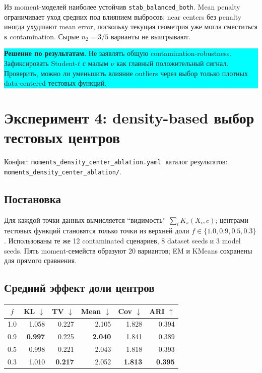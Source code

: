 \documentclass[11pt,a4paper]{article}
\newcommand{\code}[1]{{\footnotesize\nolinkurl{#1}}}
\newcommand{\best}[1]{\textbf{\color{green}#1}}
\newcommand{\decision}[1]{%
  \begin{center}
  \colorbox{cyan}{\parbox{0.94\linewidth}{%
    \textbf{\sffamily\color{navy}Решение по результатам.} #1}}
  \end{center}
}
\newcommand{\configlink}[1]{%
  \code{#1.yaml}}
\newcommand{\resultslink}[1]{%
  \code{#1/}}
\newcommand{\runrefs}[1]{%
  \small\color{midgray}%
  Конфиг: \configlink{#1}\enspace|\enspace
  каталог результатов: \resultslink{#1}.%
  \normalsize\color{black}}
\begin{document}
Из moment-моделей наиболее устойчив \code{stab_balanced_both}.
Mean penalty ограничивает уход средних под влиянием выбросов; near centers
без penalty иногда ухудшают mean error, поскольку текущая геометрия уже могла
сместиться к contamination. Сырые $n_2=3/5$ варианты не выигрывают.

\decision{Не заявлять общую contamination-robustness. Зафиксировать
Student-$t$ с малым $\nu$ как главный положительный сигнал. Проверить,
можно ли уменьшить влияние outliers через выбор только плотных data-centered
тестовых функций.}

\section{Эксперимент 4: density-based выбор тестовых центров}

\runrefs{moments_density_center_ablation}

\subsection{Постановка}

Для каждой точки данных вычисляется ``видимость''
$\sum_i K_s(X_i,c)$; центрами тестовых функций становятся только точки из
верхней доли $f\in\{1.0,0.9,0.5,0.3\}$. Использованы те же 12 contaminated
сценариев, 8 dataset seeds и 3 model seeds. Пять moment-семейств образуют
20 вариантов; EM и KMeans сохранены для прямого сравнения.

\subsection{Средний эффект доли центров}

\begin{center}
\small
\begin{tabular}{@{}crrrrr@{}}
\toprule
\rowcolor{lightgray}
$f$ & \textbf{KL} $\downarrow$ & \textbf{TV} $\downarrow$ &
\textbf{Mean} $\downarrow$ & \textbf{Cov} $\downarrow$ & \textbf{ARI} $\uparrow$\\
\midrule
1.0 & 1.058 & 0.227 & 2.105 & 1.828 & 0.394\\
0.9 & \best{0.997} & 0.225 & \best{2.040} & 1.841 & 0.389\\
0.5 & 0.998 & 0.221 & 2.043 & 1.818 & 0.393\\
0.3 & 1.010 & \best{0.217} & 2.052 & \best{1.813} & \best{0.395}\\
\bottomrule
\end{tabular}
\end{center}
\end{document}
